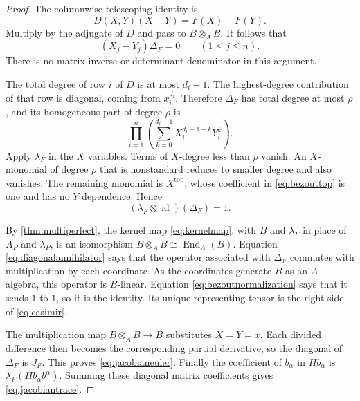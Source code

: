 \documentclass[11pt,letterpaper,oneside]{article}
\numberwithin{equation}{section}
\theoremstyle{definition}
\theoremstyle{remark}\newtheorem{remark}[theorem]{Remark}
\newcommand{\id}{\operatorname{id}}\newcommand{\re}{\operatorname{Re}}
\begin{document}
\begin{proof}
The columnwise telescoping identity is
\[
 D(X,Y)(X-Y)=F(X)-F(Y).
\]
Multiply by the adjugate of $D$ and pass to $B\otimes_A B$. It follows
that
\begin{equation}\label{eq:diagonalannihilator}
 (X_j-Y_j)\Delta_F=0\qquad(1\leq j\leq n).
\end{equation}
There is no matrix inverse or determinant denominator in this argument.

The total degree of row $i$ of $D$ is at most $d_i-1$.
The highest-degree contribution of that row is diagonal, coming from
$x_i^{d_i}$. Therefore $\Delta_F$ has total degree at most $\rho$,
and its homogeneous part of degree $\rho$ is
\begin{equation}\label{eq:bezouttop}
 \prod_{i=1}^n
 \left(\sum_{k=0}^{d_i-1}X_i^{d_i-1-k}Y_i^k\right).
\end{equation}
Apply $\lambda_F$ in the $X$ variables. Terms of $X$-degree less than
$\rho$ vanish. An $X$-monomial of degree $\rho$ that is nonstandard
reduces to smaller degree and also vanishes. The remaining monomial is
$X^{\mathrm{top}}$, whose coefficient in \eqref{eq:bezouttop} is one
and has no $Y$ dependence. Hence
\begin{equation}\label{eq:bezoutnormalization}
 (\lambda_F\otimes\id)(\Delta_F)=1.
\end{equation}

By \cref{thm:multiperfect}, the kernel map \eqref{eq:kernelmap}, with
$B$ and $\lambda_F$ in place of $A_P$ and $\lambda_P$, is an
isomorphism $B\otimes_A B\cong\operatorname{End}_A(B)$.
Equation \eqref{eq:diagonalannihilator} says that the operator associated
with $\Delta_F$ commutes with multiplication by each coordinate. As the
coordinates generate $B$ as an $A$-algebra, this operator is $B$-linear.
Equation \eqref{eq:bezoutnormalization} says that it sends $1$ to $1$,
so it is the identity. Its unique representing tensor is the right side
of \eqref{eq:casimir}.

The multiplication map $B\otimes_A B\to B$ substitutes $X=Y=x$.
Each divided difference then becomes the corresponding partial derivative,
so the diagonal of $\Delta_F$ is $J_F$. This proves
\eqref{eq:jacobianeuler}. Finally the coefficient of $b_\alpha$ in
$Hb_\alpha$ is $\lambda_F(Hb_\alpha b^\alpha)$. Summing these diagonal
matrix coefficients gives \eqref{eq:jacobiantrace}.
\end{proof}
\end{document}
